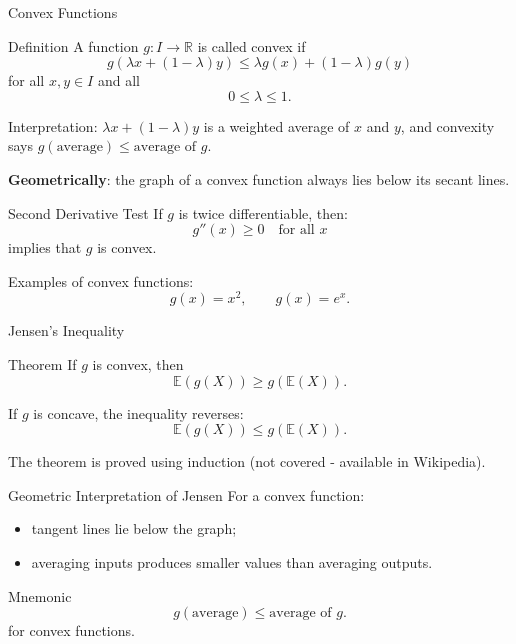 \begin{frame}{Convex Functions}
\begin{keybox}{Definition}
A function \(g:I\to\mathbb{R}\) is called convex if
\[
g(\lambda x+(1-\lambda)y)
\le
\lambda g(x)+(1-\lambda)g(y)
\]
for all \(x,y\in I\) and all
\[
0\le \lambda \le 1.
\]
\end{keybox}


Interpretation: $\lambda x+(1-\lambda)y$ is a weighted average of \(x\) and \(y\), and convexity says $g(\text{average})
\le
\text{average of } g.$

\textbf{Geometrically}: the graph of a convex function always lies below its secant lines.

\begin{keybox}{Second Derivative Test}
If \(g\) is twice differentiable, then:
\[
g''(x)\ge0
\quad \text{for all } x
\]
implies that \(g\) is convex.
\end{keybox}
 

Examples of convex functions:
\[
g(x)=x^2,
\qquad
g(x)=e^x.
\]
\end{frame}

\begin{frame}{Jensen's Inequality}
\begin{keybox}{Theorem}
If $g$ is convex, then
\[
{
\mathbb{E}(g(X))
\ge
g(\mathbb{E}(X)).
}
\]
\end{keybox}

If $g$ is concave, the inequality reverses:
\[
{
\mathbb{E}(g(X))
\le
g(\mathbb{E}(X)).
}
\]

The theorem is proved using induction (not covered - available in Wikipedia).
\end{frame}

\begin{frame}{Geometric Interpretation of Jensen}
For a convex function:
\begin{itemize}
    \item tangent lines lie below the graph;
    \item averaging inputs produces smaller values than averaging outputs.
\end{itemize}

\vspace{0.25cm}

\begin{keybox}{Mnemonic}
\[
g(\text{average})
\le
\text{average of }g.
\]
for convex functions.
\end{keybox}
\end{frame}

